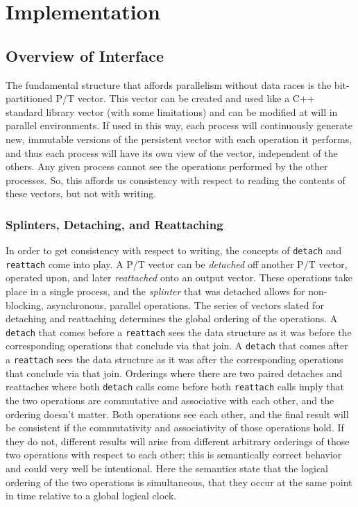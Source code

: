 \chapter{Implementation}

\section{Overview of Interface}
The fundamental structure that affords parallelism without data races is the
bit-partitioned P/T vector. This vector can be created and used like a C++
standard library vector (with some limitations) and can be modified at will in
parallel environments. If used in this way, each process will continuously
generate new, immutable versions of the persistent vector with each operation it
performs, and thus each process will have its own view of the vector,
independent of the others. Any given process cannot see the operations performed
by the other processes. So, this affords us consistency with respect to reading
the contents of these vectors, but not with writing.

\subsection{Splinters, Detaching, and Reattaching} In order to get consistency
with respect to writing, the concepts of \texttt{detach} and \texttt{reattach}
come into play. A P/T vector can be \textit{detached} off another P/T vector,
operated upon, and later \textit{reattached} onto an output vector. These
operations take place in a single process, and the \textit{splinter} that was
detached allows for non-blocking, asynchronous, parallel operations. The series
of vectors slated for detaching and reattaching determines the global ordering
of the operations. A \texttt{detach} that comes before a \texttt{reattach} sees
the data structure as it was before the corresponding operations that conclude
via that join. A \texttt{detach} that comes after a \texttt{reattach} sees the
data structure as it was after the corresponding operations that conclude via
that join. Orderings where there are two paired detaches and reattaches where
both \texttt{detach} calls come before both \texttt{reattach} calls imply that
the two operations are commutative and associative with each other, and the
ordering doesn't matter. Both operations see each other, and the final result
will be consistent if the commutativity and associativity of those operations
hold. If they do not, different results will arise from different arbitrary
orderings of those two operations with respect to each other; this is
semantically correct behavior and could very well be intentional.  Here the
semantics state that the logical ordering of the two operations is simultaneous,
that they occur at the same point in time relative to a global logical clock.


